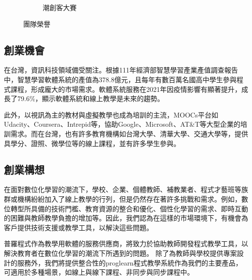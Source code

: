 \begin{figure}[H]
\begin{subfigure}{0.31\linewidth}
    \caption{潮創客大賽}
    \label{fig:Awards-2}
  \end{subfigure}
  \caption{團隊榮譽}
\end{figure}

\subsection{創業機會}
在台灣，資訊科技領域備受關注。根據111年經濟部智慧學習產業產值調查報告\cite{ref:111產業產值調查報告}中，智慧學習軟體系統的產值為378.8億元，且每年有數百萬名國高中學生參與程式課程\cite{ref:學生數量}，形成龐大的市場需求。軟體系統服務在2021年因疫情影響有顯著提升，成長了79.6\%，顯示軟體系統和線上教學是未來的趨勢。

此外，以視訊為主的教材與虛擬教學也成為培訓的主流\cite{ref:企業培訓}，MOOCs平台如Udacity、Coursera、Intrepid等，協助Google、Microsoft、AT\&T等大型企業的培訓需求。而在台灣，也有許多教育機構如台灣大學、清華大學、交通大學等，提供具學分、證照、微學位等的線上課程，並有許多學生參與。

\subsection{創業構想}

在面對數位化學習的潮流下，學校、企業、個體教師、補教業者、程式才藝班等族群或機構紛紛加入了線上教學的行列，但是仍然存在著許多挑戰和需求\cite{ref:111產業產值調查報告}\cite{ref:110產業產值調查報告}。例如，數位轉型所具備的技術門檻、教育資源的整合和優化、個性化學習的需求、即時互動的困難與教師教學負擔的增加\cite{ref:老師的困難}等。因此，我們認為在這樣的市場環境下，有機會為客戶提供技術支援或教學工具，以解決這些問題。

普羅程式作為教學用軟體的服務供應商，將致力於協助教師開發程式教學工具，以解決教育者在數位化學習的潮流下所遇到的問題。
除了為教師與學校提供專案設計的服務外，我們將提供整合性的proglearn程式教學系統作為我們的主要產品，可適用於多種場景，如線上與線下課程、非同步與同步課程中。


